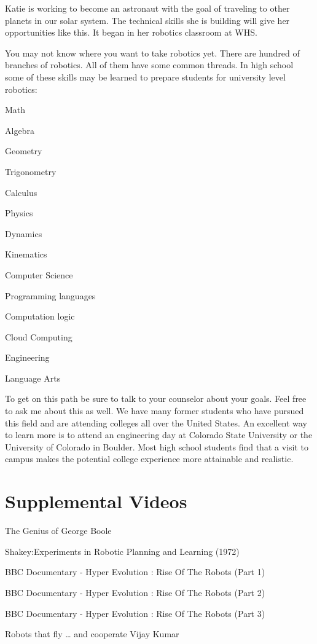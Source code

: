 \documentclass[
]{book}
\begin{document}
Katie is working to become an astronaut with the goal of traveling to other planets in our solar system. The technical skills she is building will give her opportunities like this. It began in her robotics classroom at WHS.

You may not know where you want to take robotics yet. There are hundred of branches of robotics. All of them have some common threads. In high school some of these skills may be learned to prepare students for university level robotics:

Math

Algebra

Geometry

Trigonometry

Calculus

Physics

Dynamics

Kinematics

Computer Science

Programming languages

Computation logic

Cloud Computing

Engineering

Language Arts

To get on this path be sure to talk to your counselor about your goals. Feel free to ask me about this as well. We have many former students who have pursued this field and are attending colleges all over the United States. An excellent way to learn more is to attend an engineering day at Colorado State University or the University of Colorado in Boulder. Most high school students find that a visit to campus makes the potential college experience more attainable and realistic.

\hypertarget{supplemental-videos}{%
\section{Supplemental Videos}\label{supplemental-videos}}

The Genius of George Boole

Shakey:Experiments in Robotic Planning and Learning (1972)

BBC Documentary - Hyper Evolution : Rise Of The Robots (Part 1)

BBC Documentary - Hyper Evolution : Rise Of The Robots (Part 2)

BBC Documentary - Hyper Evolution : Rise Of The Robots (Part 3)

Robots that fly \ldots{} and cooperate \textbar{} Vijay Kumar
\end{document}
